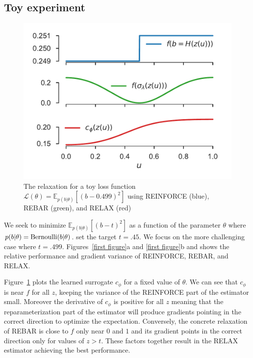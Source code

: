 \documentclass{article}
\newcommand{\E}{\mathbb{E}}
\begin{document}
\subsection{Toy experiment}
\begin{figure}
	\centering
		\vspace{-3mm}
	\hspace{-2.5mm}\includegraphics[width=0.50\columnwidth ]{figures/relaxations_t_499_which_2} 
		\vspace*{-6mm}
	\caption{ The relaxation for a toy loss function ${\mathcal{L}(\theta) = \E_{p(b|\theta)} [ (b - 0.499)^2 ]}$ using REINFORCE (blue), REBAR (green), and RELAX (red)} 
	\label{learned-relaxations}
\end{figure}
We seek to minimize $\mathbb{E}_{p(b|\theta)}[(b - t)^2]$ as a function of the parameter $\theta$ where {$p(b|\theta) = \textnormal{Bernoulli}(b|\theta)$}. \cite{tucker2017rebar} set the target $t = .45$.
We focus on the more challenging case where $t = .499$.
Figures~\ref{first figure}a and \ref{first figure}b and shows the relative performance and gradient variance of REINFORCE, REBAR, and RELAX.


Figure~\ref{learned-relaxations} plots the learned surrogate $c_\phi$ for a fixed value of $\theta$. We can see that $c_\phi$ is near $f$ for all $z$, keeping the variance of the REINFORCE part of the estimator small. Moreover the derivative of $c_\phi$ is positive for all $z$ meaning that the reparameterization part of the estimator will produce gradients pointing in the correct direction to optimize the expectation. Conversely, the concrete relaxation of REBAR is close to $f$ only near $0$ and $1$ and its gradient points in the correct direction only for values of $z > t$. These factors together result in the RELAX estimator achieving the best performance. 
\end{document}
